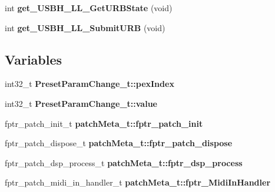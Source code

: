 \begin{DoxyCompactItemize}
\item 
int {\bfseries get\+\_\+\+U\+S\+B\+H\+\_\+\+L\+L\+\_\+\+Get\+U\+R\+B\+State} (void)\hypertarget{group__PATCH_ga05aa92abe7e90474091add2554820246}{}\label{group__PATCH_ga05aa92abe7e90474091add2554820246}

\item 
int {\bfseries get\+\_\+\+U\+S\+B\+H\+\_\+\+L\+L\+\_\+\+Submit\+U\+RB} (void)\hypertarget{group__PATCH_gaf2e89a7133ca1609e7e1075329ca6805}{}\label{group__PATCH_gaf2e89a7133ca1609e7e1075329ca6805}

\end{DoxyCompactItemize}
\subsection*{Variables}
\begin{DoxyCompactItemize}
\item 
int32\+\_\+t {\bfseries Preset\+Param\+Change\+\_\+t\+::pex\+Index}\hypertarget{group__PATCH_ga5993131207a8812bfb8280f0915e0131}{}\label{group__PATCH_ga5993131207a8812bfb8280f0915e0131}

\item 
int32\+\_\+t {\bfseries Preset\+Param\+Change\+\_\+t\+::value}\hypertarget{group__PATCH_gafd29ca990b414b4f654b104f4a41f368}{}\label{group__PATCH_gafd29ca990b414b4f654b104f4a41f368}

\item 
fptr\+\_\+patch\+\_\+init\+\_\+t {\bfseries patch\+Meta\+\_\+t\+::fptr\+\_\+patch\+\_\+init}\hypertarget{group__PATCH_gaf1cff0cb196778473d5ec00382be18a5}{}\label{group__PATCH_gaf1cff0cb196778473d5ec00382be18a5}

\item 
fptr\+\_\+patch\+\_\+dispose\+\_\+t {\bfseries patch\+Meta\+\_\+t\+::fptr\+\_\+patch\+\_\+dispose}\hypertarget{group__PATCH_gaa59d24908b9dc71d8ae21267d859992c}{}\label{group__PATCH_gaa59d24908b9dc71d8ae21267d859992c}

\item 
fptr\+\_\+patch\+\_\+dsp\+\_\+process\+\_\+t {\bfseries patch\+Meta\+\_\+t\+::fptr\+\_\+dsp\+\_\+process}\hypertarget{group__PATCH_ga91b3b1edb6ac60764135a3dc6196c252}{}\label{group__PATCH_ga91b3b1edb6ac60764135a3dc6196c252}

\item 
fptr\+\_\+patch\+\_\+midi\+\_\+in\+\_\+handler\+\_\+t {\bfseries patch\+Meta\+\_\+t\+::fptr\+\_\+\+Midi\+In\+Handler}\hypertarget{group__PATCH_ga147bcaac9dda3b5fe042bcb87dc7e86d}{}\label{group__PATCH_ga147bcaac9dda3b5fe042bcb87dc7e86d}


\end{DoxyCompactItemize}
